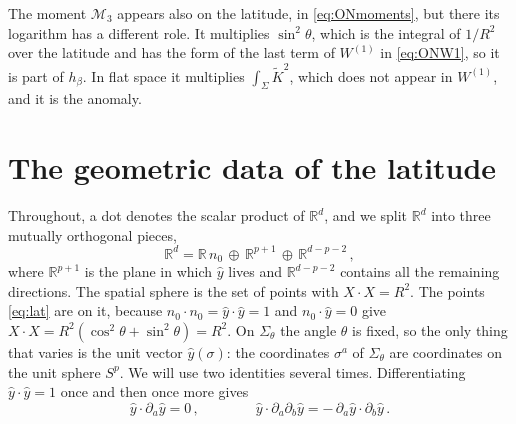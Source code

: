 \documentclass[a4paper,11pt]{article}
\newcommand{\Kt}{\widetilde{K}}
\begin{document}
The moment $\mathcal{M}_3$ appears also on the latitude, in \eqref{eq:ONmoments}, but there its logarithm has a different role. It multiplies $\sin^2\theta$, which is the integral of $1/R^2$ over the latitude and has the form of the last term of $W^{(1)}$ in \eqref{eq:ONW1}, so it is part of $h_\beta$. In flat space it multiplies $\int_\Sigma\Kt^2$, which does not appear in $W^{(1)}$, and it is the anomaly.
	
	
	
	
\appendix 

\section{The geometric data of the latitude}\label{appAgeom}
Throughout, a dot denotes the scalar product of $\mathbb{R}^d$, and we split $\mathbb{R}^d$ into three mutually orthogonal pieces,
\begin{equation}\label{eq:split}
	\mathbb{R}^d=\mathbb{R}\,n_0\,\oplus\,\mathbb{R}^{p+1}\,\oplus\,\mathbb{R}^{d-p-2}\, ,
\end{equation}
where $\mathbb{R}^{p+1}$ is the plane in which $\hat y$ lives and $\mathbb{R}^{d-p-2}$ contains all the remaining directions. The spatial sphere is the set of points with $X\cdot X=R^2$. The points \eqref{eq:lat} are on it, because $n_0\cdot n_0=\hat y\cdot\hat y=1$ and $n_0\cdot\hat y=0$ give $X\cdot X=R^2(\cos^2\theta+\sin^2\theta)=R^2$. On $\Sigma_\theta$ the angle $\theta$ is fixed, so the only thing that varies is the unit vector $\hat y(\sigma)$: the coordinates $\sigma^a$ of $\Sigma_\theta$ are coordinates on the unit sphere $S^p$. We will use two identities several times. Differentiating $\hat y\cdot\hat y=1$ once and then once more gives
\begin{equation}\label{eq:yid}
	\hat y\cdot\partial_a\hat y=0\, ,\qquad\qquad \hat y\cdot\partial_a\partial_b\hat y=-\,\partial_a\hat y\cdot\partial_b\hat y\, .
\end{equation}
\end{document}
